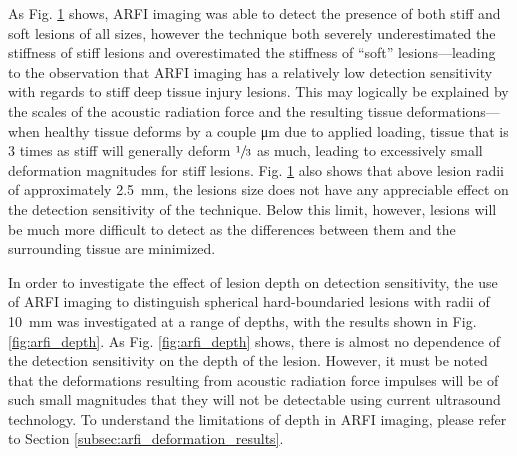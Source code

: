 			\begin{figure}[!htb]
				\centering
				\caption[]{}
				\label{fig:arfi_radius}
			\end{figure}

			As Fig. \ref{fig:arfi_radius} shows, ARFI imaging was able to detect the presence of both stiff and soft lesions of all sizes, however the technique both severely underestimated the stiffness of stiff lesions and overestimated the stiffness of ``soft'' lesions---leading to the observation that ARFI imaging has a relatively low detection sensitivity with regards to stiff deep tissue injury lesions. This may logically be explained by the scales of the acoustic radiation force and the resulting tissue deformations---when healthy tissue deforms by a couple \si{\um} due to applied loading, tissue that is 3 times as stiff will generally deform $\sfrac{1}{3}$ as much, leading to excessively small deformation magnitudes for stiff lesions. Fig. \ref{fig:arfi_radius} also shows that above lesion radii of approximately \SI{2.5}{\mm}, the lesions size does not have any appreciable effect on the detection sensitivity of the technique. Below this limit, however, lesions will be much more difficult to detect as the differences between them and the surrounding tissue are minimized.

			In order to investigate the effect of lesion depth on detection sensitivity, the use of ARFI imaging to distinguish spherical hard-boundaried lesions with radii of \SI{10}{\mm} was investigated at a range of depths, with the results shown in Fig. \ref{fig:arfi_depth}. As Fig. \ref{fig:arfi_depth} shows, there is almost no dependence of the detection sensitivity on the depth of the lesion. However, it must be noted that the deformations resulting from acoustic radiation force impulses will be of such small magnitudes that they will not be detectable using current ultrasound technology. To understand the limitations of depth in ARFI imaging, please refer to Section \ref{subsec:arfi_deformation_results}.

